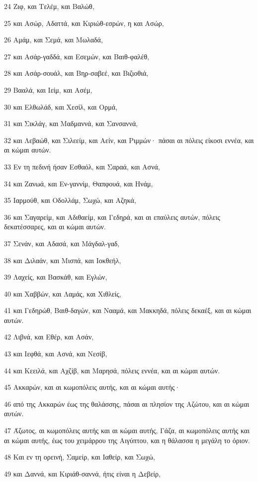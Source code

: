 \par 24 Ζιφ, και Τελέμ, και Βαλώθ,
\par 25 και Ασώρ, Αδαττά, και Κιριώθ-εσρών, η και Ασώρ,
\par 26 Αμάμ, και Σεμά, και Μωλαδά,
\par 27 και Ασάρ-γαδδά, και Εσεμών, και Βαιθ-φαλέθ,
\par 28 και Ασάρ-σουάλ, και Βηρ-σαβεέ, και Βιζιοθιά,
\par 29 Βααλά, και Ιείμ, και Ασέμ,
\par 30 και Ελθωλάδ, και Χεσίλ, και Ορμά,
\par 31 και Σικλάγ, και Μαδμαννά, και Σανσαννά,
\par 32 και Λεβαώθ, και Σιλεείμ, και Αείν, και Ριμμών· πάσαι αι πόλεις είκοσι εννέα, και αι κώμαι αυτών.
\par 33 Εν τη πεδινή ήσαν Εσθαόλ, και Σαραά, και Ασνά,
\par 34 και Ζανωά, και Εν-γαννίμ, Θαπφουά, και Ηνάμ,
\par 35 Ιαρμούθ, και Οδολλάμ, Σωχώ, και Αζηκά,
\par 36 και Σαγαρείμ, και Αδιθαείμ, και Γεδηρά, και αι επαύλεις αυτών, πόλεις δεκατέσσαρες, και αι κώμαι αυτών.
\par 37 Σενάν, και Αδασά, και Μάγδαλ-γαδ,
\par 38 και Διλαάν, και Μισπά, και Ιοκθεήλ,
\par 39 Λαχείς, και Βασκάθ, και Εγλών,
\par 40 και Χαββών, και Λαμάς, και Χιθλείς,
\par 41 και Γεδηρώθ, Βαιθ-δαγών, και Νααμά, και Μακκηδά, πόλεις δεκαέξ, και αι κώμαι αυτών.
\par 42 Λιβνά, και Εθέρ, και Ασάν,
\par 43 και Ιεφθά, και Ασνά, και Νεσίβ,
\par 44 και Κεειλά, και Αχζίβ, και Μαρησά, πόλεις εννέα, και αι κώμαι αυτών.
\par 45 Ακκαρών, και αι κωμοπόλεις αυτής, και αι κώμαι αυτής·
\par 46 από της Ακκαρών έως της θαλάσσης, πάσαι αι πλησίον της Αζώτου, και αι κώμαι αυτών.
\par 47 Άζωτος, αι κωμοπόλεις αυτής και αι κώμαι αυτής, Γάζα, αι κωμοπόλεις αυτής και αι κώμαι αυτής, έως του χειμάρρου της Αιγύπτου, και η θάλασσα η μεγάλη το όριον.
\par 48 Και εν τη ορεινή, Σαμείρ, και Ιαθείρ, και Σωχώ,
\par 49 και Δαννά, και Κιριάθ-σαννά, ήτις είναι η Δεβείρ,
